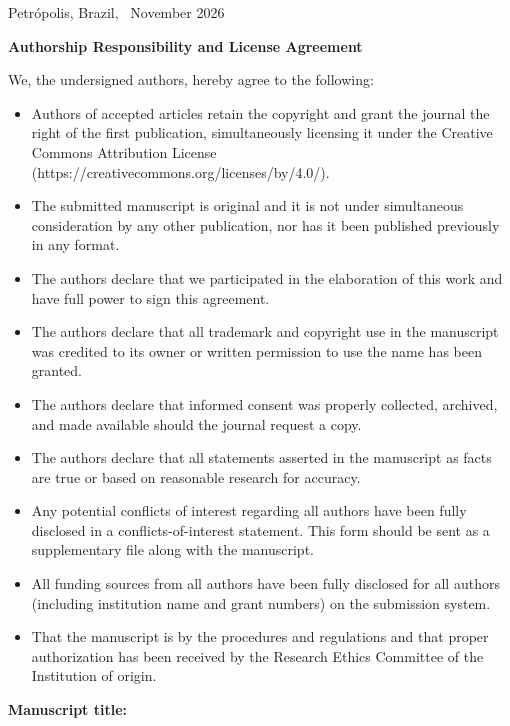\documentclass[12pt,a4paper]{article}
\newcommand{\blank}{\underline{\hspace{2cm}}}
\begin{document}
\begin{flushright}
Petrópolis, Brazil, \blank\ November 2026
\end{flushright}

\begin{center}
{\large\bfseries Authorship Responsibility and License Agreement}
\end{center}

We, the undersigned authors, hereby agree to the following:

\begin{itemize}
\setlength{\itemsep}{2pt}
\item Authors of accepted articles retain the copyright and grant the journal the right of the first publication, simultaneously licensing it under the Creative Commons Attribution License (https://creativecommons.org/licenses/by/4.0/).
\item The submitted manuscript is original and it is not under simultaneous consideration by any other publication, nor has it been published previously in any format.
\item The authors declare that we participated in the elaboration of this work and have full power to sign this agreement.
\item The authors declare that all trademark and copyright use in the manuscript was credited to its owner or written permission to use the name has been granted.
\item The authors declare that informed consent was properly collected, archived, and made available should the journal request a copy.
\item The authors declare that all statements asserted in the manuscript as facts are true or based on reasonable research for accuracy.
\item Any potential conflicts of interest regarding all authors have been fully disclosed in a conflicts-of-interest statement. This form should be sent as a supplementary file along with the manuscript.
\item All funding sources from all authors have been fully disclosed for all authors (including institution name and grant numbers) on the submission system.
\item That the manuscript is by the procedures and regulations and that proper authorization has been received by the Research Ethics Committee of the Institution of origin.
\end{itemize}

\textbf{Manuscript title:}
\end{document}

